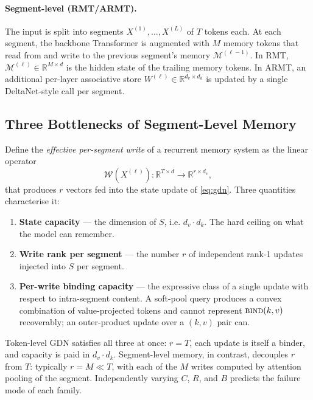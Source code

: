 \documentclass[11pt]{article}
\begin{document}
\paragraph{Segment-level (RMT/ARMT).} The input is split into segments $X^{(1)}, \dots, X^{(L)}$ of $T$ tokens each. At each segment, the backbone Transformer is augmented with $M$ memory tokens that read from and write to the previous segment's memory $\mathcal{M}^{(\ell-1)}$. In RMT, $\mathcal{M}^{(\ell)} \in \mathbb{R}^{M \times d}$ is the hidden state of the trailing memory tokens. In ARMT, an additional per-layer associative store $W^{(\ell)} \in \mathbb{R}^{d_v \times d_k}$ is updated by a single DeltaNet-style call per segment.

\subsection{Three Bottlenecks of Segment-Level Memory}
\label{sec:three-bottlenecks}

Define the \emph{effective per-segment write} of a recurrent memory system as the linear operator
\begin{equation}
    \mathcal{W}(X^{(\ell)}) : \mathbb{R}^{T \times d} \to \mathbb{R}^{r \times d_v},
\end{equation}
that produces $r$ vectors fed into the state update of \eqref{eq:gdn}. Three quantities characterise it:

\begin{enumerate}
    \item[\textbf{(C)}] \textbf{State capacity} — the dimension of $S$, i.e. $d_v \cdot d_k$. The hard ceiling on what the model can remember.
    \item[\textbf{(R)}] \textbf{Write rank per segment} — the number $r$ of independent rank-1 updates injected into $S$ per segment.
    \item[\textbf{(B)}] \textbf{Per-write binding capacity} — the expressive class of a single update with respect to intra-segment content. A soft-pool query produces a convex combination of value-projected tokens and cannot represent $\textsc{bind}(k, v)$ recoverably; an outer-product update over a $(k, v)$ pair can.
\end{enumerate}

Token-level GDN satisfies all three at once: $r{=}T$, each update is itself a binder, and capacity is paid in $d_v \cdot d_k$. Segment-level memory, in contrast, decouples $r$ from $T$: typically $r{=}M{\ll}T$, with each of the $M$ writes computed by attention pooling of the segment. Independently varying $C$, $R$, and $B$ predicts the failure mode of each family.
\end{document}
